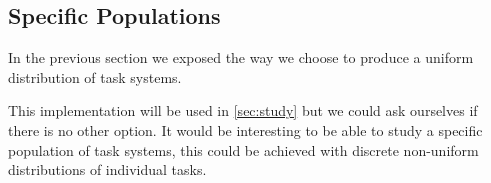 \subsection{Specific Populations}

In the previous section we exposed the way we choose to produce a uniform distribution of task systems.

This implementation will be used in \ref{sec:study} but we could ask ourselves if there is no other option.
It would be interesting to be able to study a specific population of task systems, this could be achieved with discrete non-uniform distributions of individual tasks.